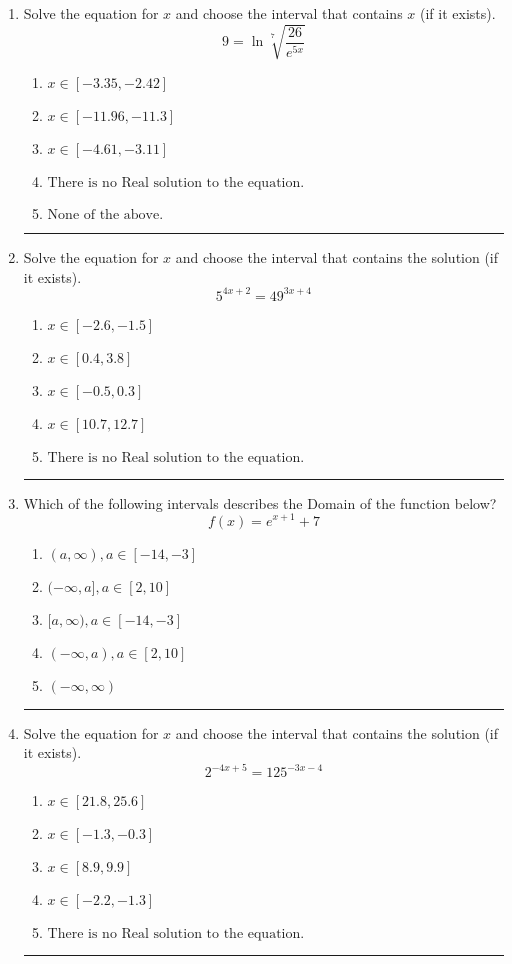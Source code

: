 \documentclass[14pt]{extbook}
\newcommand{\litem}[1]{\item#1\hspace*{-1cm}\rule{\textwidth}{0.4pt}}
\begin{document}
\begin{enumerate}
\litem{
 Solve the equation for $x$ and choose the interval that contains $x$ (if it exists).\[  9 = \ln{\sqrt[7]{\frac{26}{e^{5x}}}} \]\begin{enumerate}[label=\Alph*.]
\item \( x \in [-3.35, -2.42] \)
\item \( x \in [-11.96, -11.3] \)
\item \( x \in [-4.61, -3.11] \)
\item \( \text{There is no Real solution to the equation.} \)
\item \( \text{None of the above.} \)

\end{enumerate} }
\litem{
Solve the equation for $x$ and choose the interval that contains the solution (if it exists).\[ 5^{4x+2} = 49^{3x+4} \]\begin{enumerate}[label=\Alph*.]
\item \( x \in [-2.6, -1.5] \)
\item \( x \in [0.4, 3.8] \)
\item \( x \in [-0.5, 0.3] \)
\item \( x \in [10.7, 12.7] \)
\item \( \text{There is no Real solution to the equation.} \)

\end{enumerate} }
\litem{
Which of the following intervals describes the Domain of the function below?\[ f(x) = e^{x+1}+7 \]\begin{enumerate}[label=\Alph*.]
\item \( (a, \infty), a \in [-14, -3] \)
\item \( (-\infty, a], a \in [2, 10] \)
\item \( [a, \infty), a \in [-14, -3] \)
\item \( (-\infty, a), a \in [2, 10] \)
\item \( (-\infty, \infty) \)

\end{enumerate} }
\litem{
Solve the equation for $x$ and choose the interval that contains the solution (if it exists).\[ 2^{-4x+5} = 125^{-3x-4} \]\begin{enumerate}[label=\Alph*.]
\item \( x \in [21.8, 25.6] \)
\item \( x \in [-1.3, -0.3] \)
\item \( x \in [8.9, 9.9] \)
\item \( x \in [-2.2, -1.3] \)
\item \( \text{There is no Real solution to the equation.} \)


\end{enumerate}}
\end{enumerate}
\end{document}
